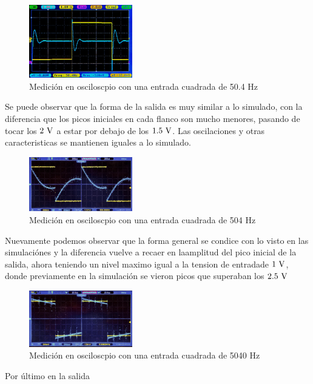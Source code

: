\begin{centering}
	\begin{figure}[hbt]
		\centering
		\includegraphics[width=0.4\textwidth]{imagenes/Captura50.jpg}
		\caption{Medici\'on en osciloscpio con una entrada cuadrada de 50.4 Hz}
	\end{figure}
\end{centering}

Se puede observar que la forma de la salida es muy similar a lo simulado, con la diferencia que los picos iniciales en cada flanco son mucho menores, pasando de tocar los $2\ \si{\volt}$ a estar por debajo de los $1.5\ \si{\volt}$. Las oscilaciones y otras caracteristicas se mantienen iguales a lo simulado.

\begin{centering}
	\begin{figure}[hbt]
		\centering
		\includegraphics[width=0.4\textwidth]{imagenes/Captura500.jpg}
		\caption{Medici\'on en osciloscpio con una entrada cuadrada de 504 Hz}
	\end{figure}
\end{centering}

Nuevamente podemos observar que la forma  general se condice con lo visto en las simulaci\'ones y la diferencia vuelve a recaer en laamplitud del pico inicial de la salida, ahora teniendo un nivel maximo igual a la tension de entradade $1\ \si{\volt}$, donde previamente en la simulaci\'on se vieron picos que superaban los $2.5 \ \si{\volt}$

\begin{centering}
	\begin{figure}[hbt]
		\centering
		\includegraphics[width=0.4\textwidth]{imagenes/Captura5000.jpg}
		\caption{Medici\'on en osciloscpio con una entrada cuadrada de 5040 Hz}
	\end{figure}
\end{centering}

Por \'ultimo en la salida 

